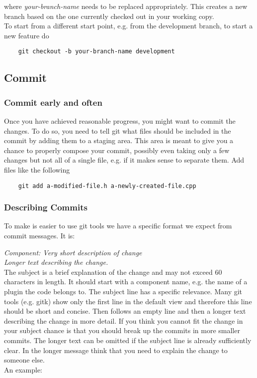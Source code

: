 \documentclass[twoside,12pt,a4paper]{article}
\begin{document}
where \emph{your-branch-name} needs to be replaced appropriately. This creates a new branch based on the one currently checked out in your working copy. \\
To start from a different start point, e.g. from the development branch, to start a new feature do

\begin{lstlisting}
	git checkout -b your-branch-name development
\end{lstlisting}


\subsection{Commit} %
\label{sub:Commit}

\subsubsection{Commit early and often} %
\label{ssub:commit_early}

Once you have achieved reasonable progress, you might want to commit the changes. To do so, you need to tell git what files should be included in the commit by adding them to a staging area. This area is meant to give you a chance to properly compose your commit, possibly even taking only a few changes but not all of a single file, e.g. if it makes sense to separate them. Add files like the following

\begin{lstlisting}
	git add a-modified-file.h a-newly-created-file.cpp
\end{lstlisting}


\subsubsection{Describing Commits}
\label{ssub:describing_commits}

To make is easier to use git tools we have a specific format we expect from commit messages. It is:

\emph{Component: Very short description of change \\
Longer text describing the change.} \\

The subject is a brief explanation of the change and may not exceed 60 characters in length. It should start with a component name, e.g. the name of a plugin the code belongs to. The subject line has a specific relevance. Many git tools (e.g. gitk) show only the first line in the default view and therefore this line should be short and concise. Then follows an empty line and then a longer text describing the change in more detail. If you think you cannot fit the change in your subject chance is that you should break up the commits in more smaller commits. The longer text can be omitted if the subject line is already sufficiently clear. In the longer message think that you need to explain the change to someone else. \\
An example: 
\end{document}
